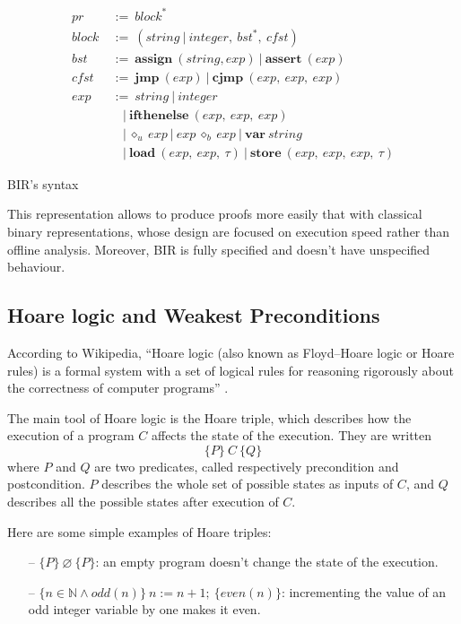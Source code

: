 \documentclass{kththesis}
\begin{document}
\begin{table}
	\begin{align*}
		pr~    & :=~block^{\ast}                                                             \\
		block~ & :=~(string~|~integer,~bst^{\ast},~cfst)                                     \\
		bst~   & :=~\textbf{assign}~(string, exp)~|~\textbf{assert}~(exp)                    \\
		cfst~  & :=~\textbf{jmp}~(exp)~|~\textbf{cjmp}~(exp,~exp,~exp)                       \\
		exp~   & :=~string~|~integer                                                         \\
		       & ~~~~|~\textbf{ifthenelse}~(exp,~exp,~exp)                                   \\
		       & ~~~~|~\diamond_{u}~exp~|~exp~\diamond_{b}~exp~|~\textbf{var}~string         \\
		       & ~~~~|~\textbf{load}~(exp,~exp,~\tau)~|~\textbf{store}~(exp,~exp,~exp,~\tau) 
	\end{align*}
	\caption{BIR's syntax}
	\label{bir-syntax}
\end{table}

This representation allows to produce proofs more easily that with classical binary representations, whose design are focused on execution speed rather than offline analysis. Moreover, BIR is fully specified and doesn't have unspecified behaviour.

\subsection{Hoare logic and Weakest Preconditions}

According to Wikipedia, ``Hoare logic (also known as Floyd–Hoare logic or Hoare rules) is a formal system with a set of logical rules for reasoning rigorously about the correctness of computer programs'' \cite{noauthor_hoare_2019}.

The main tool of Hoare logic is the Hoare triple, which describes how the execution of a program $C$ affects the state of the execution. They are written $$\{P\}~C~\{Q\}$$ where $P$ and $Q$ are two predicates, called respectively precondition and postcondition. $P$ describes the whole set of possible states as inputs of $C$, and $Q$ describes all the possible states after execution of $C$.

Here are some simple examples of Hoare triples:
\begin{itemize}
	\item[--] $\{P\}~\varnothing~\{P\}$: an empty program doesn't change the
	      state of the execution.
	\item[--] $\{n\in \mathbb{N} \land odd(n)\}~n:=n+1;~\{even(n)\}$:
	      incrementing the value of an odd integer variable by one makes it even.
\end{itemize}
\end{document}
